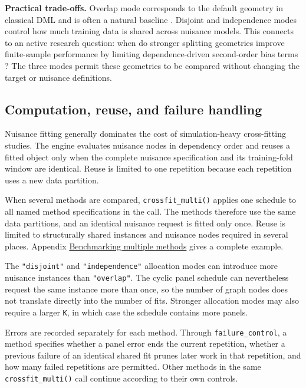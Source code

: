 \textbf{Practical trade-offs.} Overlap mode corresponds to the default geometry in classical DML and is often a natural baseline \citep{chernozhukov2018}. Disjoint and independence modes control how much training data is shared across nuisance models. This connects to an active research question: when do stronger splitting geometries improve finite-sample performance by limiting dependence-driven second-order bias terms \citep{mcclean2024, fisher2023, ke2024, chiang2022, zivich2021}? The three modes permit these geometries to be compared without changing the target or nuisance definitions.

\subsection{Computation, reuse, and failure handling}\label{subsec:performance}

Nuisance fitting generally dominates the cost of simulation-heavy cross-fitting studies. The engine evaluates nuisance nodes in dependency order and reuses a fitted object only when the complete nuisance specification and its training-fold window are identical. Reuse is limited to one repetition because each repetition uses a new data partition.

When several methods are compared, \texttt{crossfit\_multi()} applies one schedule to all named method specifications in the call. The methods therefore use the same data partitions, and an identical nuisance request is fitted only once. Reuse is limited to structurally shared instances and nuisance nodes required in several places. Appendix \hyperref[app:multi]{Benchmarking multiple methods} gives a complete example.

The \texttt{"disjoint"} and \texttt{"independence"} allocation modes can introduce more nuisance instances than \texttt{"overlap"}. The cyclic panel schedule can nevertheless request the same instance more than once, so the number of graph nodes does not translate directly into the number of fits. Stronger allocation modes may also require a larger \texttt{K}, in which case the schedule contains more panels.

Errors are recorded separately for each method. Through \texttt{failure\_control}, a method specifies whether a panel error ends the current repetition, whether a previous failure of an identical shared fit prunes later work in that repetition, and how many failed repetitions are permitted. Other methods in the same \texttt{crossfit\_multi()} call continue according to their own controls.

